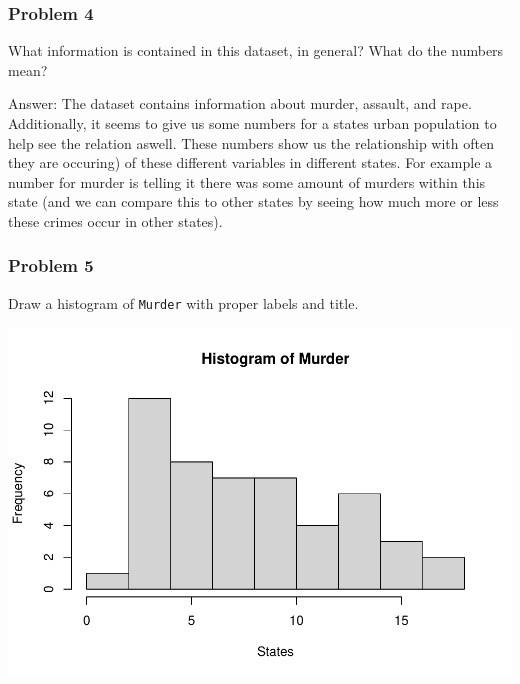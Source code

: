 \documentclass[
]{article}
\newenvironment{Shaded}{\begin{snugshade}}{\end{snugshade}}
\newcommand{\AttributeTok}[1]{\textcolor[rgb]{0.77,0.63,0.00}{#1}}
\newcommand{\FunctionTok}[1]{\textcolor[rgb]{0.00,0.00,0.00}{#1}}
\newcommand{\NormalTok}[1]{#1}
\newcommand{\SpecialCharTok}[1]{\textcolor[rgb]{0.00,0.00,0.00}{#1}}
\newcommand{\StringTok}[1]{\textcolor[rgb]{0.31,0.60,0.02}{#1}}
\begin{document}
\hypertarget{problem-4}{%
\subsubsection{Problem 4}\label{problem-4}}

What information is contained in this dataset, in general? What do the
numbers mean?

Answer: The dataset contains information about murder, assault, and
rape. Additionally, it seems to give us some numbers for a states urban
population to help see the relation aswell. These numbers show us the
relationship with often they are occuring) of these different variables
in different states. For example a number for murder is telling it there
was some amount of murders within this state (and we can compare this to
other states by seeing how much more or less these crimes occur in other
states).

\hypertarget{problem-5}{%
\subsubsection{Problem 5}\label{problem-5}}

Draw a histogram of \texttt{Murder} with proper labels and title.

\begin{Shaded}
\end{Shaded}

\includegraphics{Journal_files/figure-latex/unnamed-chunk-5-1.pdf}
\end{document}

